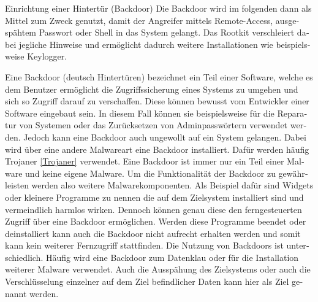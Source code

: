\begin{otherlanguage}{ngerman}
    Einrichtung einer Hintertür (Backdoor)
    \newline Die Backdoor wird im folgenden dann als Mittel zum Zweck genutzt, damit der Angreifer mittels Remote-Access, ausgespähtem Passwort oder Shell in das System gelangt. Das Rootkit verschleiert dabei jegliche Hinweise und ermöglicht dadurch weitere Installationen wie beispielsweise Keylogger.
    
    Eine Backdoor (deutsch \dq Hintertüren\dq) bezeichnet ein Teil einer Software, welche es dem Benutzer ermöglicht die Zugriffssicherung eines Systems zu umgehen und sich so Zugriff darauf zu verschaffen. Diese können bewusst vom Entwickler einer Software eingebaut sein. In diesem Fall können sie beispielsweise für die Reparatur von Systemen oder das Zurücksetzen von Adminpasswörtern verwendet werden. Jedoch kann eine Backdoor auch ungewollt auf ein System gelangen. Dabei wird über eine andere Malwareart eine Backdoor installiert. Dafür werden häufig Trojaner \ref{Trojaner} verwendet. Eine Backdoor ist immer nur ein Teil einer Malware und keine eigene Malware. Um die Funktionalität der Backdoor zu gewährleisten werden also weitere Malwarekomponenten. Als Beispiel dafür sind Widgets oder kleinere Programme zu nennen die auf dem Zielsystem installiert sind und vermeindlich harmlos wirken. Dennoch können genau diese den ferngesteuerten Zugriff über eine Backdoor ermöglichen. Werden diese Programme beendet oder deinstalliert kann auch die Backdoor nicht aufrecht erhalten werden und somit kann kein weiterer Fernzugriff stattfinden.
    Die Nutzung von Backdoors ist unterschiedlich. Häufig wird eine Backdoor zum Datenklau oder für die Installation weiterer Malware verwendet. Auch die Ausspähung des Zielsystems oder auch die Verschlüsselung einzelner auf dem Ziel befindlicher Daten kann hier als Ziel genannt werden.
  
\end{otherlanguage}